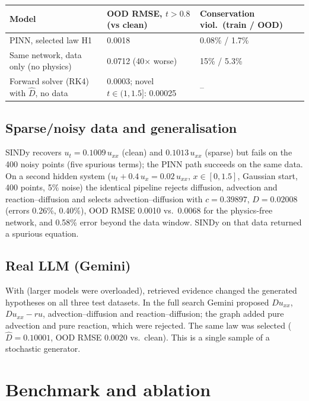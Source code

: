 \documentclass[11pt,a4paper]{article}
\begin{document}
\begin{center}
\small
\begin{tabular}{@{}L{5.4cm}L{5.4cm}L{4.6cm}@{}}
\toprule
\textbf{Model} & \textbf{OOD RMSE, $t>0.8$ (vs clean)} & \textbf{Conservation viol.\ (train / OOD)} \\ \midrule
PINN, selected law H1 & 0.0018 & 0.08\% / 1.7\% \\
Same network, data only (no physics) & 0.0712 (40$\times$ worse) & 15\% / 5.3\% \\
Forward solver (RK4) with $\hat D$, no data & 0.0003; novel $t\in(1,1.5]$: 0.00025 & -- \\
\bottomrule
\end{tabular}
\end{center}

\subsection{Sparse/noisy data and generalisation}

SINDy recovers $u_t = 0.1009\,u_{xx}$ (clean) and $0.1013\,u_{xx}$ (sparse) but fails on the 400 noisy points
(five spurious terms); the PINN path succeeds on the same data. On a second hidden system
($u_t + 0.4\,u_x = 0.02\,u_{xx}$, $x\in[0,1.5]$, Gaussian start, 400 points, 5\% noise) the identical pipeline rejects
diffusion, advection and reaction--diffusion and selects advection--diffusion with $c=0.39897$, $D=0.02008$ (errors
0.26\%, 0.40\%), OOD RMSE 0.0010 vs.\ 0.0068 for the physics-free network, and 0.58\% error beyond the data window.
SINDy on that data returned a spurious equation.

\subsection{Real LLM (Gemini)}

With  (larger models were overloaded), retrieved evidence changed the generated hypotheses on
all three test datasets. In the full search Gemini proposed $D u_{xx}$, $D u_{xx} - r u$, advection--diffusion and
reaction--diffusion; the graph added pure advection and pure reaction, which were rejected. The same law was selected
($\hat D = 0.10001$, OOD RMSE 0.0020 vs.\ clean). This is a single sample of a stochastic generator.

\section{Benchmark and ablation}
\end{document}
